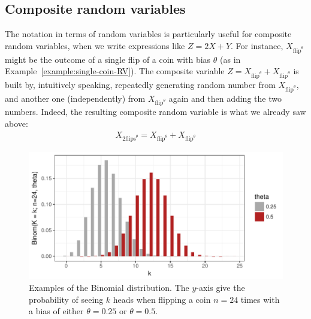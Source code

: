 \documentclass[nobib,nofonts]{tufte-handout}
\begin{document}
\subsection{Composite random variables}

The notation in terms of random variables is particularly useful for composite random variables, when we write expressions like $Z = 2X + Y$.
For instance, $X_{\text{flip}^{\theta}}$ might be the outcome of a single flip of a coin with bias $\theta$ (as in Example~\ref{example:single-coin-RV}).
The composite variable $Z = X_{\text{flip}^{\theta}} + X_{\text{flip}^{\theta}}$ is built by, intuitively speaking, repeatedly generating random number from $X_{\text{flip}^{\theta}}$, and another one (independently) from $X_{\text{flip}^{\theta}}$ again and then adding the two numbers.
Indeed, the resulting composite random variable is what we already saw above:
\begin{align*}
  X_{\text{2flips}^{\theta}} = X_{\text{flip}^{\theta}} + X_{\text{flip}^{\theta}}
\end{align*}

\begin{figure}
  \centering
  \includegraphics[width=\textwidth]{00-pics/05_00_binomial-distribution.pdf}
  \caption{Examples of the Binomial distribution. The $y$-axis give the probability of seeing
    $k$ heads when flipping a coin $n=24$ times with a bias of either $\theta = 0.25$ or
    $\theta = 0.5$.}
  \label{fig:BinomialDistribution}
\end{figure}
\end{document}
